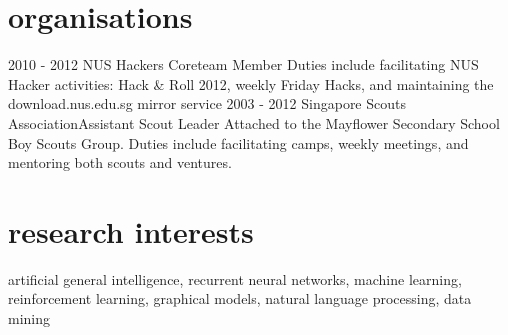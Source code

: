 \documentclass[]{friggeri-cv}
\begin{document}
\section{organisations}

\begin{entrylist}
	\entry
	{2010 - 2012}
	{NUS Hackers}
	{Coreteam Member}
	{Duties include facilitating NUS Hacker activities: Hack \& Roll 2012, 
weekly Friday Hacks, and maintaining the download.nus.edu.sg mirror service}
	\entry
	{2003 - 2012}
	{Singapore Scouts Association}{Assistant Scout Leader}
	{Attached to the Mayflower Secondary School Boy Scouts Group. Duties include 
	facilitating camps, weekly meetings, and mentoring both scouts and 
ventures.}
\end{entrylist}
\section{research interests}
artificial general intelligence, recurrent neural networks, machine learning,\\
reinforcement learning, graphical models, natural language processing, data 
mining
\end{document}
